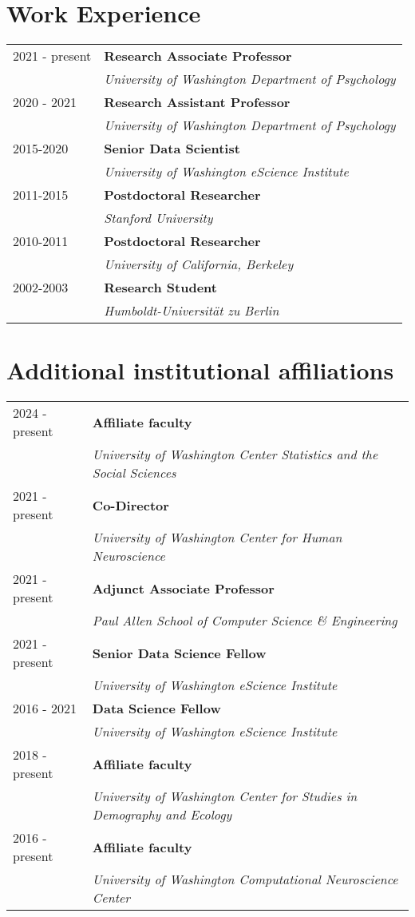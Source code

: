 \documentclass[11pt,fullpage]{article}
\begin{document}
\section*{Work Experience}
\begin{tabular}{ll}
  2021 -  present & {\bf Research Associate Professor} \\ & \emph{University of Washington Department of Psychology}\\
  2020 - 2021 & {\bf Research Assistant Professor} \\ & \emph{University of Washington Department of Psychology}\\
  2015-2020 & {\bf Senior Data Scientist}\\ & \emph{University of Washington eScience Institute}\\
  2011-2015 & {\bf Postdoctoral Researcher}\\ & \emph{Stanford University}\\
  2010-2011 & {\bf Postdoctoral Researcher}\\ & \emph{University of California, Berkeley}\\
  2002-2003 & {\bf Research Student}\\ & \emph{Humboldt-Universit\"{a}t zu Berlin}\\
\end{tabular}


\section*{Additional institutional affiliations}
\begin{tabular}{ll}
  2024 - present & {\bf Affiliate faculty } \\ & \emph{University of Washington Center Statistics and the Social Sciences} \\
  2021 - present & {\bf Co-Director} \\ & \emph{University of Washington Center for Human Neuroscience} \\
  2021 - present & {\bf Adjunct Associate Professor} \\ & \emph{Paul Allen School of Computer Science \& Engineering} \\
  2021 - present & {\bf Senior Data Science Fellow} \\ & \emph{University of Washington eScience Institute} \\
  2016 - 2021 & {\bf Data Science Fellow } \\ & \emph{University of Washington eScience Institute} \\
  2018 - present & {\bf Affiliate faculty } \\ & \emph{University of Washington Center for Studies in Demography and Ecology} \\
  2016 - present & {\bf Affiliate faculty } \\ & \emph{University of Washington Computational Neuroscience Center} \\
\end{tabular}
\end{document}
